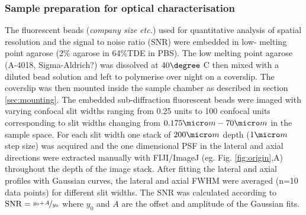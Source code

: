 \documentclass[12pt]{spieman}  %
\begin{document}
\subsubsection{Sample preparation for optical characterisation}
The fluorescent beads (\textsl{company size etc.}) used for quantitative analysis of spatial resolution and the signal to noise ratio (SNR) were embedded in low- melting point agarose (2\% agarose in 64\%TDE in PBS). The low melting point agarose (A-4018, Sigma-Aldrich?) was dissolved at $40 \degree$ C then mixed with a diluted bead solution and left to polymerise over night on a coverslip. The coverslip was then mounted inside the sample chamber as described in section \ref{sec:mounting}. The embedded sub-diffraction fluorescent beads were imaged with varying confocal slit widths ranging from 0.25 units to 100 confocal units corresponding to slit widths changing from $0.175 \micro m-70 \micro m$ in the sample space. For each slit width one stack of $200\micro m$ depth ($1 \micro m$ step size) was acquired and the one dimensional PSF in the lateral and axial directions were extracted manually with FIJI/ImageJ (eg. Fig. \ref{fig:origin},A) throughout the depth of the image stack. After fitting the lateral and axial profiles with Gaussian curves, the lateral and axial FWHM were averaged (n=10 data points) for different slit widths. The SNR was calculated according to $\text{SNR} = \nicefrac{y_0 + A}{y_0}$ where $y_0$ and $A$ are the offset and amplitude of the Gaussian fits.


\end{document}
